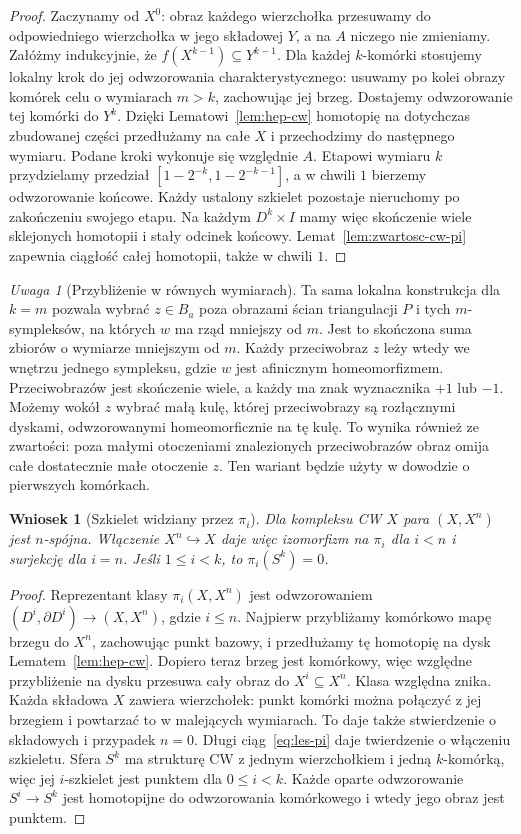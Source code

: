 \documentclass[11pt,a4paper,oneside]{report}
\theoremstyle{plain}
\newtheorem{wniosek}[twierdzenie]{Wniosek}
\theoremstyle{definition}
\theoremstyle{remark}
\newtheorem{uwaga}[twierdzenie]{Uwaga}
\begin{document}
\begin{proof}
Zaczynamy od $X^0$:
obraz każdego wierzchołka
przesuwamy do odpowiedniego
wierzchołka w jego składowej
$Y$, a na $A$ niczego
nie zmieniamy. Załóżmy
indukcyjnie, że
$f(X^{k-1})\subseteq Y^{k-1}$.
Dla każdej $k$-komórki
stosujemy lokalny krok
do jej odwzorowania
charakterystycznego:
usuwamy po kolei obrazy
komórek celu o wymiarach
$m>k$, zachowując
jej brzeg. Dostajemy
odwzorowanie tej komórki do
$Y^k$. Dzięki
Lematowi~\ref{lem:hep-cw}
homotopię na dotychczas
zbudowanej części
przedłużamy na całe $X$
i przechodzimy do
następnego wymiaru.
Podane kroki wykonuje
się względnie $A$.
Etapowi wymiaru $k$ przydzielamy przedział
$[1-2^{-k},1-2^{-k-1}]$, a w chwili $1$ bierzemy odwzorowanie końcowe.
Każdy ustalony szkielet pozostaje nieruchomy po zakończeniu swojego etapu.
Na każdym $D^k\times I$ mamy więc skończenie wiele sklejonych homotopii
i stały odcinek końcowy. Lemat~\ref{lem:zwartosc-cw-pi}
zapewnia ciągłość całej homotopii, także w chwili $1$.
\end{proof}

\begin{uwaga}[Przybliżenie w równych wymiarach]
\label{rem:przyblizenie-rowne-wymiary}
Ta sama lokalna konstrukcja dla $k=m$ pozwala wybrać $z\in B_a$
poza obrazami ścian triangulacji $P$ i tych $m$-sympleksów,
na których $w$ ma rząd mniejszy od $m$. Jest to skończona suma
zbiorów o wymiarze mniejszym od $m$. Każdy przeciwobraz $z$
leży wtedy we wnętrzu jednego sympleksu, gdzie $w$ jest afinicznym homeomorfizmem.
Przeciwobrazów jest skończenie wiele, a każdy ma znak wyznacznika $+1$ lub $-1$.
Możemy wokół $z$ wybrać małą kulę, której przeciwobrazy są rozłącznymi
dyskami, odwzorowanymi homeomorficznie na tę kulę.
To wynika również ze zwartości: poza małymi otoczeniami znalezionych
przeciwobrazów obraz omija całe dostatecznie małe otoczenie $z$.
Ten wariant będzie użyty w dowodzie o pierwszych komórkach.
\end{uwaga}

\begin{wniosek}[Szkielet widziany przez $\pi_i$]
\label{cor:pi-szkielety}
Dla kompleksu CW $X$ para
$(X,X^n)$ jest $n$-spójna.
Włączenie $X^n\hookrightarrow X$
daje więc izomorfizm na
$\pi_i$ dla $i<n$
i surjekcję dla $i=n$.
Jeśli $1\leq i<k$, to
$\pi_i(S^k)=0$.
\end{wniosek}
\begin{proof}
Reprezentant klasy
$\pi_i(X,X^n)$ jest
odwzorowaniem $(D^i,\partial D^i)\to
(X,X^n)$, gdzie $i\leq n$.
Najpierw przybliżamy komórkowo mapę brzegu do $X^n$,
zachowując punkt bazowy, i przedłużamy tę homotopię na dysk
Lematem~\ref{lem:hep-cw}. Dopiero teraz brzeg jest komórkowy,
więc względne przybliżenie na dysku przesuwa cały obraz do
$X^i\subseteq X^n$. Klasa względna znika.
Każda składowa $X$ zawiera wierzchołek: punkt komórki można
połączyć z jej brzegiem i powtarzać to w malejących wymiarach.
To daje także stwierdzenie o składowych i przypadek $n=0$.
Długi ciąg~\eqref{eq:les-pi}
daje twierdzenie o
włączeniu szkieletu.
Sfera $S^k$ ma strukturę CW
z jednym wierzchołkiem
i jedną $k$-komórką,
więc jej $i$-szkielet
jest punktem dla $0\leq i<k$.
Każde oparte odwzorowanie
$S^i\to S^k$ jest
homotopijne do odwzorowania
komórkowego i wtedy
jego obraz jest punktem.
\end{proof}
\end{document}
